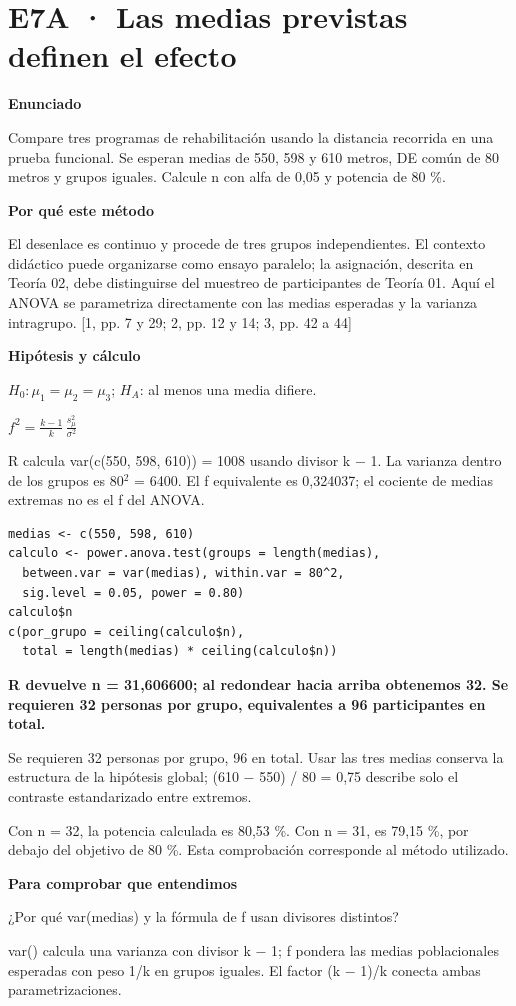 \documentclass[10pt,a4paper]{article}
\newcommand{\etiqueta}[1]{\par{\bfseries\color{Blue}#1}\par}
\newcommand{\cajares}[1]{\par\colorbox{Pale}{\parbox{\dimexpr\linewidth-2\fboxsep}{\vspace{4pt}\textbf{\color{Navy}#1}\vspace{4pt}}}\par}
\begin{document}
\section*{E7A · Las medias previstas definen el efecto}
\etiqueta{Enunciado}
Compare tres programas de rehabilitación usando la distancia recorrida en una prueba funcional. Se esperan medias de 550, 598 y 610 metros, DE común de 80 metros y grupos iguales. Calcule n con alfa de 0,05 y potencia de 80 \%.
\etiqueta{Por qué este método}
El desenlace es continuo y procede de tres grupos independientes. El contexto didáctico puede organizarse como ensayo paralelo; la asignación, descrita en Teoría 02, debe distinguirse del muestreo de participantes de Teoría 01. Aquí el ANOVA se parametriza directamente con las medias esperadas y la varianza intragrupo. [1, pp. 7 y 29; 2, pp. 12 y 14; 3, pp. 42 a 44]
\etiqueta{Hipótesis y cálculo}
$H_0:\mu_1=\mu_2=\mu_3$; $H_A$: al menos una media difiere.

$f^2=\frac{k-1}{k}\,\frac{s_{\mu}^2}{\sigma^2}$

R calcula var(c(550, 598, 610)) = 1008 usando divisor k \ensuremath{-} 1. La varianza dentro de los grupos es 80\ensuremath{^2} = 6400. El f equivalente es 0,324037; el cociente de medias extremas no es el f del ANOVA.
\begin{Verbatim}
medias <- c(550, 598, 610)
calculo <- power.anova.test(groups = length(medias),
  between.var = var(medias), within.var = 80^2,
  sig.level = 0.05, power = 0.80)
calculo$n
c(por_grupo = ceiling(calculo$n),
  total = length(medias) * ceiling(calculo$n))
\end{Verbatim}
\cajares{R devuelve n = 31,606600; al redondear hacia arriba obtenemos 32. Se requieren 32 personas por grupo, equivalentes a 96 participantes en total.}
Se requieren 32 personas por grupo, 96 en total. Usar las tres medias conserva la estructura de la hipótesis global; (610 \ensuremath{-} 550) / 80 = 0,75 describe solo el contraste estandarizado entre extremos.

{\small\color{Gray}Con n = 32, la potencia calculada es 80,53 \%. Con n = 31, es 79,15 \%, por debajo del objetivo de 80 \%. Esta comprobación corresponde al método utilizado.}
\etiqueta{Para comprobar que entendimos}
¿Por qué var(medias) y la fórmula de f usan divisores distintos?

{\small var() calcula una varianza con divisor k \ensuremath{-} 1; f pondera las medias poblacionales esperadas con peso 1/k en grupos iguales. El factor (k \ensuremath{-} 1)/k conecta ambas parametrizaciones.}
\clearpage
\end{document}
